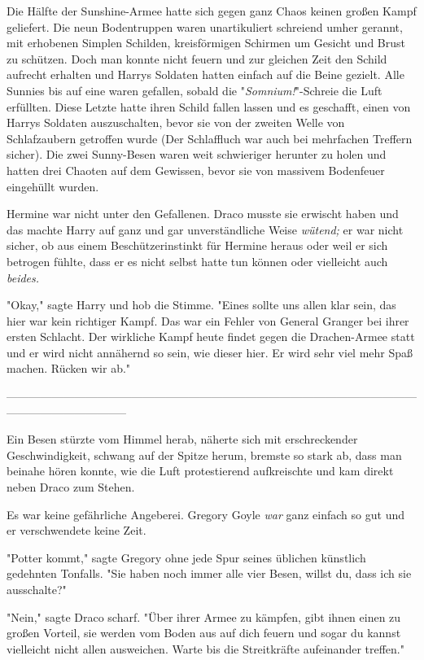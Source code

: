 {Die Hälfte der Sunshine-Armee hatte sich gegen ganz Chaos keinen großen Kampf geliefert. Die neun Bodentruppen waren unartikuliert schreiend umher gerannt, mit erhobenen Simplen Schilden, kreisförmigen Schirmen um Gesicht und Brust zu schützen. Doch man konnte nicht feuern und zur gleichen Zeit den Schild aufrecht erhalten und Harrys Soldaten hatten einfach auf die Beine gezielt. Alle Sunnies bis auf eine waren gefallen, sobald die "\emph{Somnium!}"-Schreie die Luft erfüllten. Diese Letzte hatte ihren Schild fallen lassen und es geschafft, einen von Harrys Soldaten auszuschalten, bevor sie von der zweiten Welle von Schlafzaubern getroffen wurde (Der Schlaffluch war auch bei mehrfachen Treffern sicher). Die zwei Sunny-Besen waren weit schwieriger herunter zu holen und hatten drei Chaoten auf dem Gewissen, bevor sie von massivem Bodenfeuer eingehüllt wurden.

Hermine war nicht unter den Gefallenen. Draco musste sie erwischt haben und das machte Harry auf ganz und gar unverständliche Weise \emph{wütend;} er war nicht sicher, ob aus einem Beschützerinstinkt für Hermine heraus oder weil er sich betrogen fühlte, dass er es nicht selbst hatte tun können oder vielleicht auch \emph{beides.}

"Okay," sagte Harry und hob die Stimme. "Eines sollte uns allen klar sein, das hier war kein richtiger Kampf. Das war ein Fehler von General Granger bei ihrer ersten Schlacht. Der wirkliche Kampf heute findet gegen die Drachen-Armee statt und er wird nicht annähernd so sein, wie dieser hier. Er wird sehr viel mehr Spaß machen. Rücken wir ab."

--------------------------------------------------------------------------------------------------------------------------------------------

Ein Besen stürzte vom Himmel herab, näherte sich mit erschreckender Geschwindigkeit, schwang auf der Spitze herum, bremste so stark ab, dass man beinahe hören konnte, wie die Luft protestierend aufkreischte und kam direkt neben Draco zum Stehen.

Es war keine gefährliche Angeberei. Gregory Goyle \emph{war} ganz einfach so gut und er verschwendete keine Zeit.

"Potter kommt," sagte Gregory ohne jede Spur seines üblichen künstlich gedehnten Tonfalls. "Sie haben noch immer alle vier Besen, willst du, dass ich sie ausschalte?"

"Nein," sagte Draco scharf. "Über ihrer Armee zu kämpfen, gibt ihnen einen zu großen Vorteil, sie werden vom Boden aus auf dich feuern und sogar du kannst vielleicht nicht allen ausweichen. Warte bis die Streitkräfte aufeinander treffen."

}
